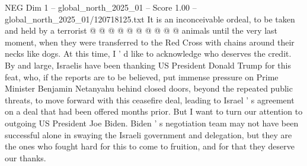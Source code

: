 \begin{textsample}{NEG Dim 1 – global\_north\_2025\_01 – Score 1.00 – global\_north\_2025\_01/120718125.txt}
It is an inconceivable ordeal, to be taken and held by a terrorist @ @ @ @ @ @ @ @ @ @ animals until the very last moment, when they were transferred to the Red Cross with chains around their necks like dogs.
At this time, I ' d like to acknowledge who deserves the credit.
By and large, Israelis have been thanking US President Donald Trump for this feat, who, if the reports are to be believed, put immense pressure on Prime Minister Benjamin Netanyahu behind closed doors, beyond the repeated public threats, to move forward with this ceasefire deal, leading to Israel ' s agreement on a deal that had been offered months prior.
But I want to turn our attention to outgoing US President Joe Biden.
Biden ' s negotiation team may not have been successful alone in swaying the Israeli government and delegation, but they are the ones who fought hard for this to come to fruition, and for that they deserve our thanks.

\end{textsample}

